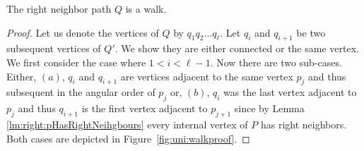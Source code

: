     \begin{lemma}
      \label{lm:right:neighborWalk}
      The right neighbor path $Q$ is a walk.
    \end{lemma}
    \begin{proof}
      Let us denote the vertices of $Q$ by $q_1 q_2 \ldots q_\ell$.
      Let $q_i$ and $q_{i+1}$ be two subsequent vertices of $Q'$. We show they are either connected or the same vertex. We first consider the case where $1 < i < \ell-1$.
      Now there are two sub-cases. Either, $(a)$, $q_i$ and $ q_{i+1}$ are vertices adjacent to the same vertex $p_j$ and thus subsequent in the angular order of $p_j$ or, $(b)$, $q_i$ was the last vertex adjacent to $p_j$ and thus $q_{i+1}$ is the first vertex adjacent to $p_{j+1}$ since by Lemma \ref{lm:right:pHasRightNeihgbours} every internal vertex of $P$ has right neighbors.
      Both cases are depicted in Figure~\ref{fig:uni:walkproof}.


\end{proof}

